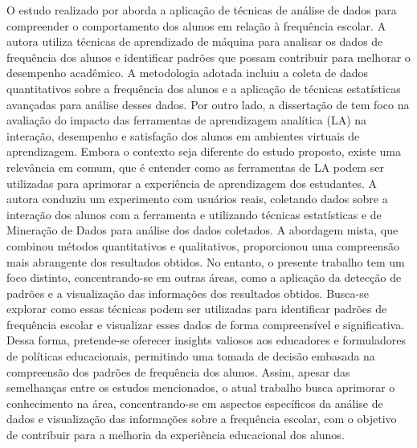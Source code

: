 O estudo realizado por  aborda a aplicação de técnicas de análise de dados para compreender o comportamento dos alunos em relação à frequência escolar. A autora utiliza técnicas de aprendizado de máquina para analisar os dados de frequência dos alunos e identificar padrões que possam contribuir para melhorar o desempenho acadêmico. A metodologia adotada incluiu a coleta de dados quantitativos sobre a frequência dos alunos e a aplicação de técnicas estatísticas avançadas para análise desses dados. Por outro lado, a dissertação de  tem foco na avaliação do impacto das ferramentas de aprendizagem analítica (LA) na interação, desempenho e satisfação dos alunos em ambientes virtuais de aprendizagem. Embora o contexto seja diferente do estudo proposto, existe uma relevância em comum, que é entender como as ferramentas de LA podem ser utilizadas para aprimorar a experiência de aprendizagem dos estudantes. A autora conduziu um experimento com usuários reais, coletando dados sobre a interação dos alunos com a ferramenta e utilizando técnicas estatísticas e de Mineração de Dados para análise dos dados coletados. A abordagem mista, que combinou métodos quantitativos e qualitativos, proporcionou uma compreensão mais abrangente dos resultados obtidos. No entanto, o presente trabalho tem um foco distinto, concentrando-se em outras áreas, como a aplicação da detecção de padrões e a visualização das informações dos resultados obtidos. Busca-se explorar como essas técnicas podem ser utilizadas para identificar padrões de frequência escolar e visualizar esses dados de forma compreensível e significativa. Dessa forma, pretende-se oferecer insights valiosos aos educadores e formuladores de políticas educacionais, permitindo uma tomada de decisão embasada na compreensão dos padrões de frequência dos alunos. Assim, apesar das semelhanças entre os estudos mencionados, o atual trabalho busca aprimorar o conhecimento na área, concentrando-se em aspectos específicos da análise de dados e visualização das informações sobre a frequência escolar, com o objetivo de contribuir para a melhoria da experiência educacional dos alunos.

